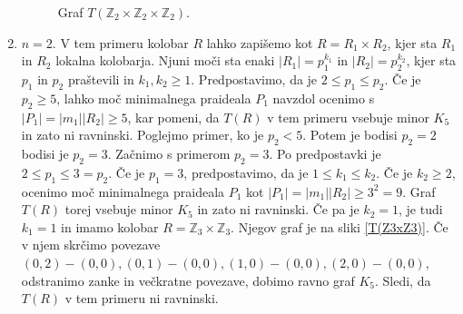 \documentclass[a4paper, 12pt]{amsart}
\theoremstyle{definition} %
\theoremstyle{plain} %
\newcommand{\Z}{\mathbb Z}
\begin{document}
\begin{enumerate}
\begin{figure}[h!]

\caption{Graf $T(\Z_2\times \Z_2 \times  \Z_2).$}
\label{T(Z2xZ2xZ2)}
\end{figure}

\item $n=2$. V tem primeru kolobar $R$ lahko zapišemo kot $R= R_1 \times R_2$, kjer sta $R_1$ in $R_2$ lokalna kolobarja. Njuni moči sta enaki $|R_1 | = p_1^{k_1}$ in $|R_2| = p_2^{k_2}$, kjer sta $p_1$ in $p_2$ praštevili in $k_1,k_2 \ge 1$. Predpostavimo, da je $2 \le p_1 \le p_2$. Če je $p_2 \ge 5$, lahko moč minimalnega praideala $P_1$ navzdol ocenimo s $|P_1| = |m_1| |R_2| \ge 5$, kar pomeni, da $T(R)$ v tem primeru vsebuje minor $K_5$ in zato ni ravninski. Poglejmo primer, ko je $p_2 <5$. Potem je bodisi $p_2=2$ bodisi je $p_2 = 3$. Začnimo s primerom $p_2=3$. Po predpostavki je $2 \le p_1 \le 3 = p_2$. Če je $p_1=3$, predpostavimo, da je $1\le k_1 \le k_2$. Če je $k_2\ge 2$,  ocenimo moč minimalnega praideala $P_1$ kot $|P_1| = |m_1||R_2| \ge 3^2 = 9$. Graf $T(R)$ torej vsebuje minor $K_5$ in zato ni ravninski. Če pa je $k_2=1$, je tudi $k_1=1$ in imamo kolobar $R= \Z_3 \times \Z_3$. Njegov graf je na sliki \ref{T(Z3xZ3)}. Če v njem skrčimo povezave $(0,2)-(0,0), (0,1)-(0,0), (1,0)-(0,0), (2,0)-(0,0)$, odstranimo zanke in večkratne povezave, dobimo ravno graf $K_5$. Sledi, da $T(R)$ v tem primeru ni ravninski.

\begin{figure}[h!]
\centering
\end{figure}
\end{enumerate}
\end{document}
